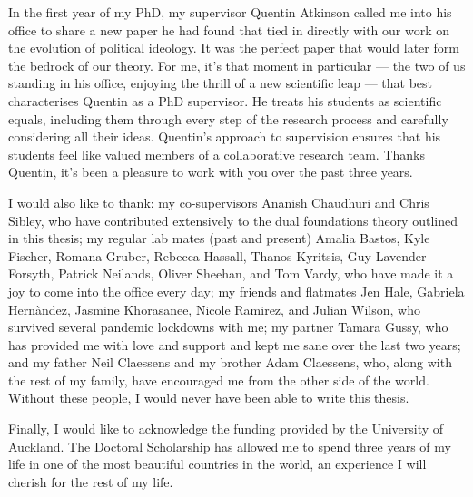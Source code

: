 In the first year of my PhD, my supervisor Quentin Atkinson called me into his office to share a new paper he had found that tied in directly with our work on the evolution of political ideology. It was the perfect paper that would later form the bedrock of our theory. For me, it's that moment in particular --- the two of us standing in his office, enjoying the thrill of a new scientific leap --- that best characterises Quentin as a PhD supervisor. He treats his students as scientific equals, including them through every step of the research process and carefully considering all their ideas. Quentin's approach to supervision ensures that his students feel like valued members of a collaborative research team. Thanks Quentin, it's been a pleasure to work with you over the past three years.

I would also like to thank: my co-supervisors Ananish Chaudhuri and Chris Sibley, who have contributed extensively to the dual foundations theory outlined in this thesis; my regular lab mates (past and present) Amalia Bastos, Kyle Fischer, Romana Gruber, Rebecca Hassall, Thanos Kyritsis, Guy Lavender Forsyth, Patrick Neilands, Oliver Sheehan, and Tom Vardy, who have made it a joy to come into the office every day; my friends and flatmates Jen Hale, Gabriela Hern\`{a}ndez, Jasmine Khorasanee, Nicole Ramirez, and Julian Wilson, who survived several pandemic lockdowns with me; my partner Tamara Gussy, who has provided me with love and support and kept me sane over the last two years; and my father Neil Claessens and my brother Adam Claessens, who, along with the rest of my family, have encouraged me from the other side of the world. Without these people, I would never have been able to write this thesis.

Finally, I would like to acknowledge the funding provided by the University of Auckland. The Doctoral Scholarship has allowed me to spend three years of my life in one of the most beautiful countries in the world, an experience I will cherish for the rest of my life.
